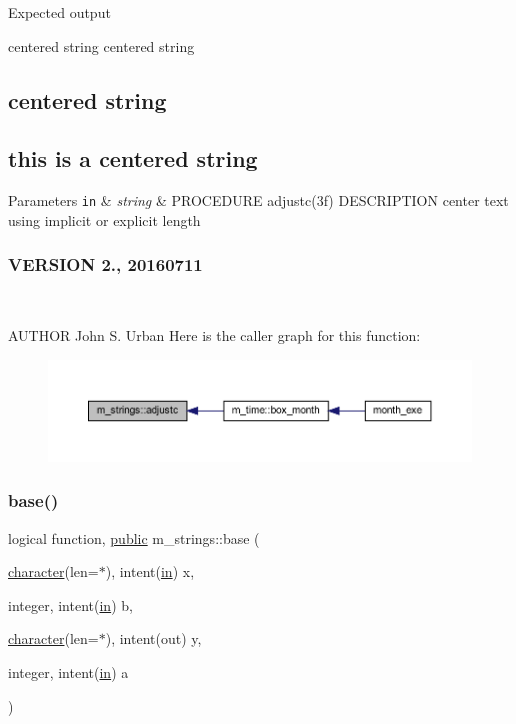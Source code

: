 Expected output 

 centered string centered string \subsection*{centered string }

\subsection*{this is a centered string }


\begin{DoxyParams}[1]{Parameters}
\mbox{\tt in}  & {\em string} & P\+R\+O\+C\+E\+D\+U\+RE adjustc(3f) D\+E\+S\+C\+R\+I\+P\+T\+I\+ON center text using implicit or explicit length \subsubsection*{V\+E\+R\+S\+I\+ON 2., 20160711}\\
\hline
\end{DoxyParams}
A\+U\+T\+H\+OR John S. Urban Here is the caller graph for this function\+:
\nopagebreak
\begin{figure}[H]
\begin{center}
\leavevmode
\includegraphics[width=350pt]{namespacem__strings_a1cacb2e45c7e3d7ed4cc1b183c35f323_icgraph}
\end{center}
\end{figure}
\mbox{\label{namespacem__strings_a635ef6f1dd73400e7b339392886d6357}} 
\subsubsection{\texorpdfstring{base()}{base()}}
{\footnotesize\ttfamily logical function, \hyperlink{M__stopwatch_83_8txt_a2f74811300c361e53b430611a7d1769f}{public} m\+\_\+strings\+::base (\begin{DoxyParamCaption}\item[{\hyperlink{option__stopwatch_83_8txt_abd4b21fbbd175834027b5224bfe97e66}{character}(len=$\ast$), intent(\hyperlink{M__journal_83_8txt_afce72651d1eed785a2132bee863b2f38}{in})}]{x,  }\item[{integer, intent(\hyperlink{M__journal_83_8txt_afce72651d1eed785a2132bee863b2f38}{in})}]{b,  }\item[{\hyperlink{option__stopwatch_83_8txt_abd4b21fbbd175834027b5224bfe97e66}{character}(len=$\ast$), intent(out)}]{y,  }\item[{integer, intent(\hyperlink{M__journal_83_8txt_afce72651d1eed785a2132bee863b2f38}{in})}]{a }\end{DoxyParamCaption})}



